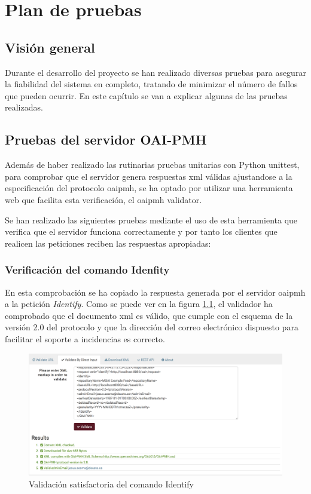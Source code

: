 \chapter{Plan de pruebas}

\section{Visión general}

Durante el desarrollo del proyecto se han realizado diversas pruebas para asegurar la fiabilidad del sistema en completo, tratando de minimizar el número de fallos que pueden ocurrir. En este capítulo se van a explicar algunas de las pruebas realizadas.

\section{Pruebas del servidor OAI-PMH}

Además de haber realizado las rutinarias pruebas unitarias con Python unittest\cite{UnitTest}, para comprobar que el servidor genera respuestas \acrshort{xml} válidas ajustandose a la especificación del protocolo \acrshort{oaipmh}, se ha optado por utilizar una herramienta web que facilita esta verificación, el \acrshort{oaipmh} validator.

Se han realizado las siguientes pruebas mediante el uso de esta herramienta que verifica que el servidor funciona correctamente y por tanto los clientes que realicen las peticiones reciben las respuestas apropiadas:

\subsection{Verificación del comando Idenfity}

En esta comprobación se ha copiado la respuesta generada por el servidor \acrshort{oaipmh} a la petición \textit{Identify}. Como se puede ver en la figura \ref{fig:identify}, el validador ha comprobado que el documento \acrshort{xml} es válido, que cumple con el esquema de la versión 2.0 del protocolo y que la dirección del correo electrónico dispuesto para facilitar el soporte a incidencias es correcto.

\begin{figure}[!htbp]
	\centering
	\includegraphics[scale=0.32]{fig/oaipmh_validations/Identify}
	\caption{Validación satisfactoria del comando Identify}
	\label{fig:identify}
\end{figure}


